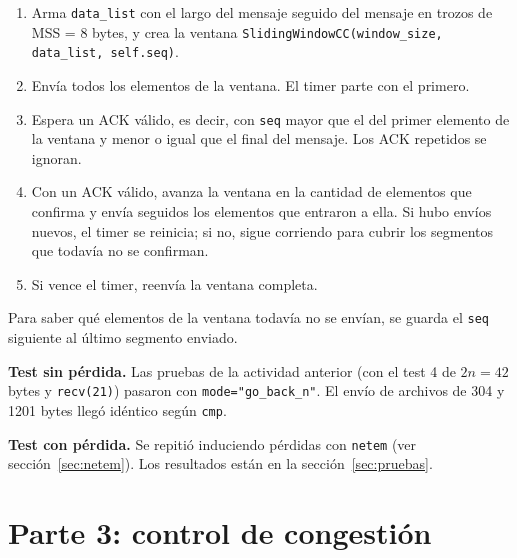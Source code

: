 \documentclass[11pt,letterpaper]{article}
\begin{document}
\begin{enumerate}[nosep]
  \item Arma \texttt{data\_list} con el largo del mensaje seguido del mensaje en trozos de
        MSS = 8 bytes, y crea la ventana \texttt{SlidingWindowCC(window\_size, data\_list,
        self.seq)}.
  \item Envía todos los elementos de la ventana. El timer parte con el primero.
  \item Espera un ACK válido, es decir, con \texttt{seq} mayor que el del primer elemento
        de la ventana y menor o igual que el final del mensaje. Los ACK repetidos se
        ignoran.
  \item Con un ACK válido, avanza la ventana en la cantidad de elementos que confirma y
        envía seguidos los elementos que entraron a ella. Si hubo envíos nuevos, el timer
        se reinicia; si no, sigue corriendo para cubrir los segmentos que todavía no se
        confirman.
  \item Si vence el timer, reenvía la ventana completa.
\end{enumerate}

Para saber qué elementos de la ventana todavía no se envían, se guarda el \texttt{seq}
siguiente al último segmento enviado.

\textbf{Test sin pérdida.} Las pruebas de la actividad anterior (con el test 4 de
$2n = 42$ bytes y \texttt{recv(21)}) pasaron con \texttt{mode="go\_back\_n"}. El envío de
archivos de 304 y 1201 bytes llegó idéntico según \texttt{cmp}.

\textbf{Test con pérdida.} Se repitió induciendo pérdidas con \texttt{netem} (ver
sección~\ref{sec:netem}). Los resultados están en la sección~\ref{sec:pruebas}.

\section{Parte 3: control de congestión}
\end{document}
